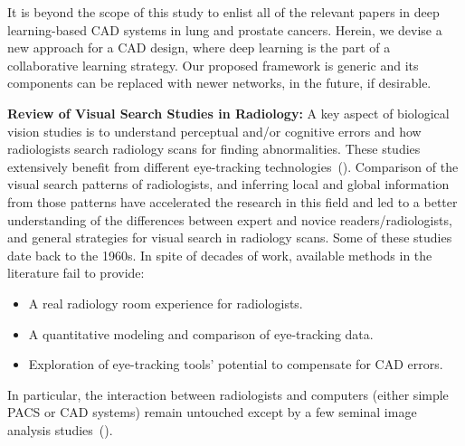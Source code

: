 \documentclass[preprint,12pt]{elsarticle}
\begin{document}
It is beyond the scope of this study to enlist all of the relevant papers in deep learning-based CAD systems in lung and prostate cancers. Herein, we devise a new approach for a CAD design, where deep learning is the part of a collaborative learning strategy. Our proposed framework is generic and its components can be replaced with newer networks, in the future, if desirable.


\textbf{Review of Visual Search Studies in Radiology:}
A key aspect of biological vision studies is to understand perceptual and/or cognitive errors and how radiologists search radiology scans for finding abnormalities. These studies extensively benefit from different eye-tracking technologies~(\cite{venjakob2016review}). Comparison of the visual search patterns of radiologists, and inferring local and global information from those patterns have accelerated the research in this field and led to a better understanding of the differences between expert and novice readers/radiologists, and general strategies for visual search in radiology scans. Some of these studies date back to the 1960s. In spite of decades of work, available methods in the literature fail to provide:
\begin{itemize}
\item A real radiology room experience for radiologists.
\item A quantitative modeling and comparison of eye-tracking data.
\item Exploration of eye-tracking tools’ potential to compensate for CAD errors.
\end{itemize}
In particular, the interaction between radiologists and computers (either simple PACS or CAD systems) remain untouched except by a few seminal image analysis studies~(\cite{drew2013scanners,khosravan2016gaze2segment,venjakob2016image}).
\end{document}
